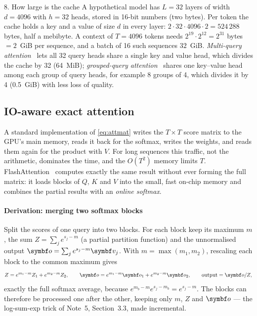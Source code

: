 \documentclass[11pt]{article}
\newcommand{\vv}{\vect{v}}
\begin{document}
\begin{worked}{8. How large is the cache}
A hypothetical model has $L = 32$ layers of width $d = 4096$ with $h = 32$ heads, stored in 16-bit numbers (two bytes). Per
token the cache holds a key and a value of size $d$ in every layer: $2 \cdot 32 \cdot 4096 \cdot 2 = 524\,288$ bytes, half a
mebibyte. A context of $T = 4096$ tokens needs $2^{19} \cdot 2^{12} = 2^{31}$ bytes $= 2$~GiB per sequence, and a batch of 16
such sequences $32$~GiB. \emph{Multi-query attention}~\cite{shazeer2019} lets all 32 query heads share a single key and value
head, which divides the cache by 32 (64~MiB); \emph{grouped-query attention}~\cite{ainslie2023} shares one key--value head
among each group of query heads, for example 8 groups of 4, which divides it by 4 (0.5~GiB) with less loss of quality.
\end{worked}

\subsection{IO-aware exact attention}\label{sec:flash}

A standard implementation of \eqref{eq:attmat} writes the $T \times T$ score matrix to the GPU's main memory, reads it back
for the softmax, writes the weights, and reads them again for the product with $V$. For long sequences this traffic, not the
arithmetic, dominates the time, and the $O(T^2)$ memory limits $T$. FlashAttention~\cite{dao2022} computes exactly the same
result without ever forming the full matrix: it loads blocks of $Q$, $K$ and $V$ into the small, fast on-chip memory and
combines the partial results with an \emph{online softmax}.

\paragraph{Derivation: merging two softmax blocks} Split the scores of one query into two blocks. For each block keep its
maximum $m$, the sum $Z = \sum_j e^{s_j - m}$ (a partial partition function) and the unnormalised output $\vect{o} = \sum_j e^{s_j - m}\vv_j$. With
$m = \max(m_1, m_2)$, rescaling each block to the common maximum gives
\begin{equation}\label{eq:online}
  Z = e^{m_1 - m}Z_1 + e^{m_2 - m}Z_2, \qquad \vect{o} = e^{m_1 - m}\vect{o}_1 + e^{m_2 - m}\vect{o}_2, \qquad
  \text{output} = \vect{o}/Z ,
\end{equation}
exactly the full softmax average, because $e^{m_b - m}e^{s_j - m_b} = e^{s_j - m}$. The blocks can therefore be processed one
after the other, keeping only $m$, $Z$ and $\vect{o}$ --- the log-sum-exp trick of Note~5, Section~3.3, made incremental.
\end{document}
